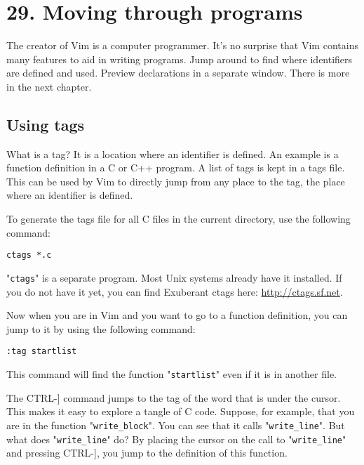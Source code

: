 \section{29. Moving through programs}
The creator of Vim is a computer programmer.
It's no surprise that Vim contains many features to aid in writing programs.
Jump around to find where identifiers are defined and used.
Preview declarations in a separate window.
There is more in the next chapter.
\localtableofcontents
\subsection{Using tags}
\label{Using tags}
What is a tag?  It is a location where an identifier is defined.
An example is a function definition in a C or C++ program.
A list of tags is kept in a tags file.
This can be used by Vim to directly jump from any place to the tag, the place where an identifier is defined.

To generate the tags file for all C files in the current directory, use the following command:

\begin{Verbatim}[samepage=true]
 ctags *.c
\end{Verbatim}

"\texttt{ctags}" is a separate program.
Most Unix systems already have it installed.
If you do not have it yet, you can find Exuberant ctags here: \url{http://ctags.sf.net}.

Now when you are in Vim and you want to go to a function definition, you can jump to it by using the following command:

\begin{Verbatim}[samepage=true]
 :tag startlist
\end{Verbatim}

This command will find the function "\texttt{startlist}" even if it is in another file.

The CTRL-] command jumps to the tag of the word that is under the cursor.
This makes it easy to explore a tangle of C code.
Suppose, for example, that you are in the function "\texttt{write\_block}".
You can see that it calls "\texttt{write\_line}".
But what does "\texttt{write\_line}" do?  By placing the cursor on the call to "\texttt{write\_line}" and pressing CTRL-], you jump to the definition of this function.


